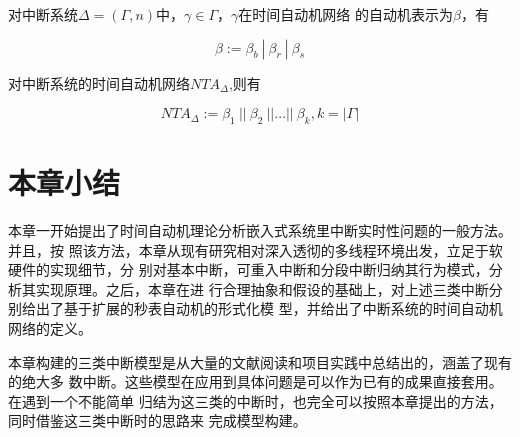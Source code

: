 对中断系统$\Delta=(\varGamma, n)$中，$\gamma\in\varGamma$，$\gamma$在时间自动机网络
的自动机表示为$\beta$，有

\begin{equation}
	\beta := \beta_b~|~\beta_r~|~\beta_s
\end{equation}

对中断系统的时间自动机网络$NTA_\Delta$,则有

\begin{equation}
	NTA_\Delta := \beta_1~||~\beta_2~||\dots||~\beta_k, k = |\varGamma|
\end{equation}

\section{本章小结}
\label{sec:sum_3}

本章一开始提出了时间自动机理论分析嵌入式系统里中断实时性问题的一般方法。并且，按
照该方法，本章从现有研究相对深入透彻的多线程环境出发，立足于软硬件的实现细节，分
别对基本中断，可重入中断和分段中断归纳其行为模式，分析其实现原理。之后，本章在进
行合理抽象和假设的基础上，对上述三类中断分别给出了基于扩展的秒表自动机的形式化模
型，并给出了中断系统的时间自动机网络的定义。

本章构建的三类中断模型是从大量的文献阅读和项目实践中总结出的，涵盖了现有的绝大多
数中断。这些模型在应用到具体问题是可以作为已有的成果直接套用。在遇到一个不能简单
归结为这三类的中断时，也完全可以按照本章提出的方法，同时借鉴这三类中断时的思路来
完成模型构建。



